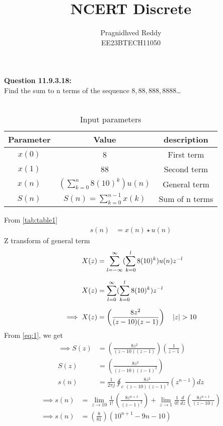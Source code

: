 \documentclass[journal,12pt,twocolumn]{IEEEtran}
\title{NCERT Discrete}
\author{Pragnidhved Reddy\\EE23BTECH11050}
\date{}
\begin{document}
\maketitle
\newpage
\bigskip
\textbf{Question 11.9.3.18:}\\
 Find the sum to n terms of the sequence $8,88,888,8888$\ldots\\
 \solution \\
 \begin{table}[H]
\centering
\setlength{\extrarowheight}{8pt}
\begin{tabular}{|c|c|c|}\hline
\textbf{Parameter} & \textbf{Value} & \textbf{description}\\ \hline
$x(0)$ & 8 & First term \\ \hline
$x(1)$ & 88 & Second term \\ \hline 
$x(n)$ & $(\sum^{n}_{k=0}8(10)^k)u(n)$ & General term \\ \hline
$S(n)$ & $S(n)=\sum^{n-1}_{k=0}x(k)$ & Sum of n terms \\ \hline
\end{tabular}
\caption{Input parameters}
\label{tab:table1}
\end{table}
 From \eqref{tab:table1}
\begin{align}
\label{eq:1}
 s(n)&=x(n)\star u(n)
 \end{align}
 Z transform of general term
 \begin{align}
 X(z)&=\sum_{l=-\infty}^{\infty}(\sum_{k=0}^{l}8(10)^k)u(n)z^{-l}\\[6pt]
 X(z)&=\sum_{l=0}^{\infty}(\sum_{k=0}^{l}8(10)^k)z^{-l}\\[6pt]
 \implies X(z)&=\left(\frac{8z^2}{(z-10)(z-1)}\right) \quad \left\vert z\right\vert>10
\end{align}
From \eqref{eq:1}, we get
 \begin{align}
 \label{eq:6}
 \implies S(z)&=\left(\frac{8z^2}{(z-10)(z-1)}\right)\left(\frac{1}{z-1}\right)\\[6pt]
 S(z)&=\left(\frac{8z^2}{(z-10)(z-1)^2}\right)\\[6pt]
 s(n)&=\frac{1}{2\pi j}\oint_{c}\frac{8z^2}{(z-10)(z-1)^2}(z^{n-1})dz
 \end{align}
 \begin{align}
\implies s(n)&=\lim_{z\to10}\frac{1}{1\displaystyle !\,}\left(\frac{8z^{n+1}}{(z-1)^2}\right)+\lim_{z\to1}\frac{1}{0\displaystyle !\,}\frac{d}{dz}\left(\frac{8z^{n+1}}{(z-10)}\right)\\
\implies s(n)&=\left(\frac{8}{81}\right)(10^{n+1}-9n-10)   
\end{align}
 
\end{document}
